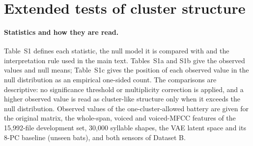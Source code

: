 \documentclass[11pt]{article}
\begin{document}
\section{Extended tests of cluster structure}
\paragraph{Statistics and how they are read.} Table~S1 defines each statistic, the null model it is compared with and the interpretation rule used in the main text. Tables~S1a and S1b give the observed values and null means; Table~S1c gives the position of each observed value in the null distribution as an empirical one-sided count. The comparisons are descriptive: no significance threshold or multiplicity correction is applied, and a higher observed value is read as cluster-like structure only when it exceeds the null distribution. Observed values of the one-cluster-allowed battery are given for the original matrix, the whole-span, voiced and voiced-MFCC features of the 15,992-file development set, 30,000 syllable shapes, the VAE latent space and its 8-PC baseline (unseen bats), and both sensors of Dataset B.
\end{document}
